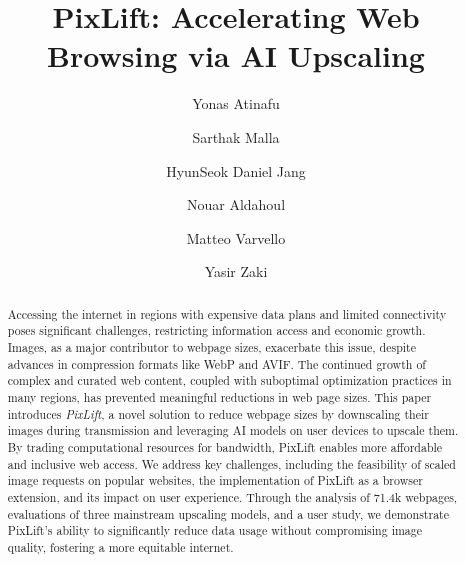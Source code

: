 \documentclass[acmsmall]{acmart}
\newcommand{\tool}{{PixLift}\xspace}
\begin{document}
\title{PixLift: Accelerating Web Browsing via AI Upscaling}


\author{Yonas Atinafu}

\author{Sarthak Malla}

\author{HyunSeok Daniel Jang}

\author{Nouar Aldahoul}

\author{Matteo Varvello}

\author{Yasir Zaki}


\renewcommand{\shortauthors}{Atinafu et al.}

\begin{abstract}
    Accessing the internet in regions with expensive data plans and limited connectivity poses significant challenges, restricting information access and economic growth. Images, as a major contributor to webpage sizes, exacerbate this issue, despite advances in compression formats like WebP and AVIF. The continued growth of complex and curated web content, coupled with suboptimal optimization practices in many regions, has prevented meaningful reductions in web page sizes. 
    This paper introduces \textit{\tool}, a novel solution to reduce webpage sizes by downscaling their images during transmission and leveraging AI models on user devices to upscale them. By trading computational resources for bandwidth, \tool enables more affordable and inclusive web access.  
    We address key challenges, including the feasibility of scaled image requests on popular websites, the implementation of \tool as a browser extension, and its impact on user experience. Through the analysis of 71.4k webpages, evaluations of three mainstream upscaling models, and a user study, we demonstrate \tool's ability to significantly reduce data usage without compromising image quality, fostering a more equitable internet.
\end{abstract}






\maketitle
\end{document}

